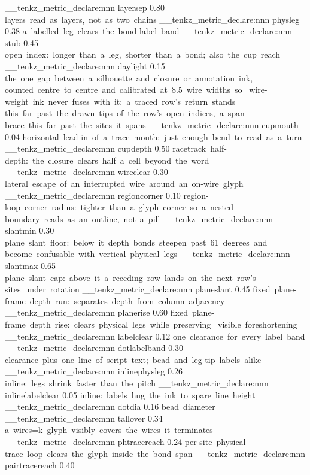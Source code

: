 \__tenkz_metric_declare:nnn {layersep} {0.80}
  { layers~read~as~layers,~not~as~two~chains }
\__tenkz_metric_declare:nnn {physleg} {0.38}
  { a~labelled~leg~clears~the~bond-label~band }
\__tenkz_metric_declare:nnn {stub} {0.45}
  { open~index:~longer~than~a~leg,~shorter~than~a~bond;~also~the~cup~reach }
\__tenkz_metric_declare:nnn {daylight} {0.15}
  { the~one~gap~between~a~silhouette~and~closure~or~annotation~ink,~
    counted~centre~to~centre~and~calibrated~at~8.5~wire~widths~so~
    wire-weight~ink~never~fuses~with~it:~a~traced~row's~return~stands~
    this~far~past~the~drawn~tips~of~the~row's~open~indices,~a~span~
    brace~this~far~past~the~sites~it~spans }
\__tenkz_metric_declare:nnn {cupmouth} {0.04}
  { horizontal~lead-in~of~a~trace~mouth:~just~enough~bend~to~read~as~a~turn }
\__tenkz_metric_declare:nnn {cupdepth} {0.50}
  { racetrack~half-depth:~the~closure~clears~half~a~cell~beyond~the~word }
\__tenkz_metric_declare:nnn {wireclear} {0.30}
  { lateral~escape~of~an~interrupted~wire~around~an~on-wire~glyph }
\__tenkz_metric_declare:nnn {regioncorner} {0.10}
  { region-loop~corner~radius:~tighter~than~a~glyph~corner~so~a~nested~
    boundary~reads~as~an~outline,~not~a~pill }
\__tenkz_metric_declare:nnn {slantmin} {0.30}
  { plane~slant~floor:~below~it~depth~bonds~steepen~past~61~degrees~and~
    become~confusable~with~vertical~physical~legs }
\__tenkz_metric_declare:nnn {slantmax} {0.65}
  { plane~slant~cap:~above~it~a~receding~row~lands~on~the~next~row's~
    sites~under~rotation }
\__tenkz_metric_declare:nnn {planeslant} {0.45}
  { fixed~plane-frame~depth~run:~separates~depth~from~column~adjacency }
\__tenkz_metric_declare:nnn {planerise} {0.60}
  { fixed~plane-frame~depth~rise:~clears~physical~legs~while~preserving~
    visible~foreshortening }
\__tenkz_metric_declare:nnn {labelclear} {0.12}
  { one~clearance~for~every~label~band }
\__tenkz_metric_declare:nnn {dotlabelband} {0.30}
  { clearance~plus~one~line~of~script~text;~bead~and~leg-tip~labels~alike }
\__tenkz_metric_declare:nnn {inlinephysleg} {0.26}
  { inline:~legs~shrink~faster~than~the~pitch }
\__tenkz_metric_declare:nnn {inlinelabelclear} {0.05}
  { inline:~labels~hug~the~ink~to~spare~line~height }
\__tenkz_metric_declare:nnn {dotdia} {0.16}
  { bead~diameter }
\__tenkz_metric_declare:nnn {tallover} {0.34}
  { a~wires=k~glyph~visibly~covers~the~wires~it~terminates }
\__tenkz_metric_declare:nnn {phtracereach} {0.24}
  { per-site~physical-trace~loop~clears~the~glyph~inside~the~bond~span }
\__tenkz_metric_declare:nnn {pairtracereach} {0.40}
